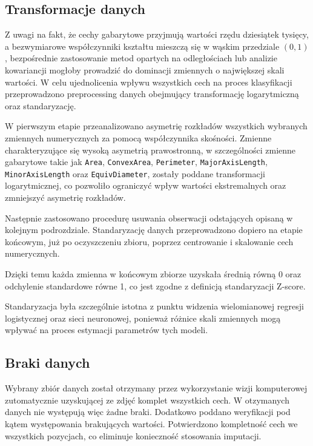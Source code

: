 \documentclass{report}
\begin{document}
\subsection{Transformacje danych}

Z uwagi na fakt, że cechy gabarytowe przyjmują wartości rzędu dziesiątek tysięcy, a bezwymiarowe współczynniki kształtu mieszczą się w wąskim przedziale $(0,1)$, bezpośrednie zastosowanie metod opartych na odległościach lub analizie kowariancji mogłoby prowadzić do dominacji zmiennych o największej skali wartości. W celu ujednolicenia wpływu wszystkich cech na proces klasyfikacji przeprowadzono preprocessing danych obejmujący transformację logarytmiczną oraz standaryzację.

W pierwszym etapie przeanalizowano asymetrię rozkładów wszystkich wybranych zmiennych numerycznych za pomocą współczynnika skośności. Zmienne charakteryzujące się wysoką asymetrią prawostronną, w szczególności zmienne gabarytowe takie jak \texttt{Area}, \texttt{ConvexArea}, \texttt{Perimeter}, \texttt{MajorAxisLength}, \texttt{MinorAxisLength} oraz \texttt{EquivDiameter}, zostały poddane transformacji logarytmicznej, co pozwoliło ograniczyć wpływ wartości ekstremalnych oraz zmniejszyć asymetrię rozkładów.

Następnie zastosowano procedurę usuwania obserwacji odstających opisaną w kolejnym podrozdziale. Standaryzację danych przeprowadzono dopiero na etapie końcowym, już po oczyszczeniu zbioru, poprzez centrowanie i skalowanie cech numerycznych.

Dzięki temu każda zmienna w końcowym zbiorze uzyskała średnią równą 0 oraz odchylenie standardowe równe 1, co jest zgodne z definicją standaryzacji Z-score.

Standaryzacja była szczególnie istotna z punktu widzenia wielomianowej regresji logistycznej oraz sieci neuronowej, ponieważ różnice skali zmiennych mogą wpływać na proces estymacji parametrów tych modeli.

\subsection{Braki danych}

Wybrany zbiór danych został otrzymany przez wykorzystanie wizji komputerowej zutomatycznie uzyskującej ze zdjęć komplet wszystkich cech. W otzymanych danych nie występują więc żadne braki. Dodatkowo poddano weryfikacji pod kątem występowania brakujących wartości. Potwierdzono kompletność cech we wszystkich pozycjach, co eliminuje konieczność stosowania imputacji.
\end{document}
